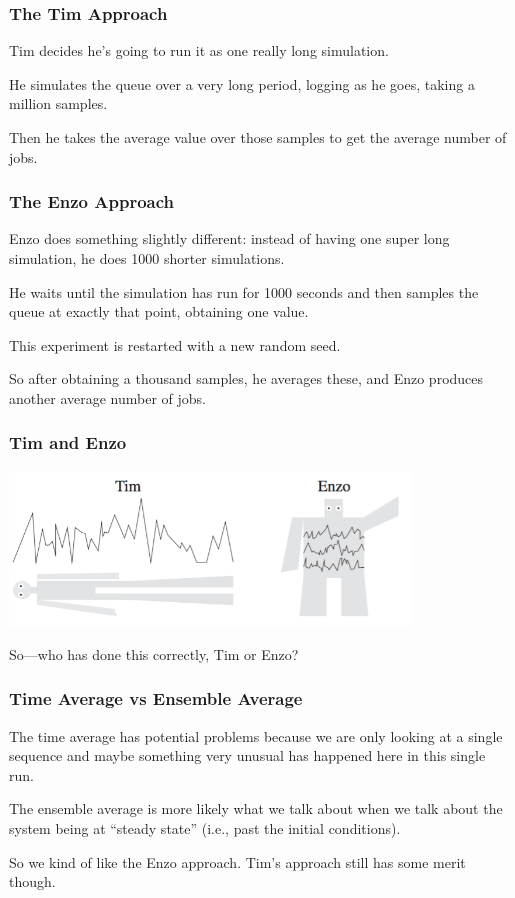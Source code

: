 \begin{frame}
\frametitle{The Tim Approach}

Tim decides he's going to run it as one really long simulation. 

He simulates the queue over a very long period, logging as he goes, taking a million samples. 

Then he takes the average value over those samples to get the average number of jobs.

\end{frame}



\begin{frame}
\frametitle{The Enzo Approach}

Enzo does something slightly different: instead of having one super long simulation, he does 1000 shorter simulations. 

He waits until the simulation has run for 1000 seconds and then samples the queue at exactly that point, obtaining one value. 

This experiment is restarted with a new random seed. 

So after obtaining a thousand samples, he averages these, and Enzo produces another average number of jobs.


\end{frame}



\begin{frame}
\frametitle{Tim and Enzo}

\begin{center}
	\includegraphics[width=0.8\textwidth]{images/timenzo.png}
\end{center}

So---who has done this correctly, Tim or Enzo?

\end{frame}



\begin{frame}
\frametitle{Time Average vs Ensemble Average}

The time average has potential problems because we are only looking at a single sequence and maybe something very unusual has happened here in this single run. 

The ensemble average is more likely what we talk about when we talk about the system being at ``steady state'' (i.e., past the initial conditions). 

So we kind of like the Enzo approach. Tim's approach still has some merit though.

\end{frame}



